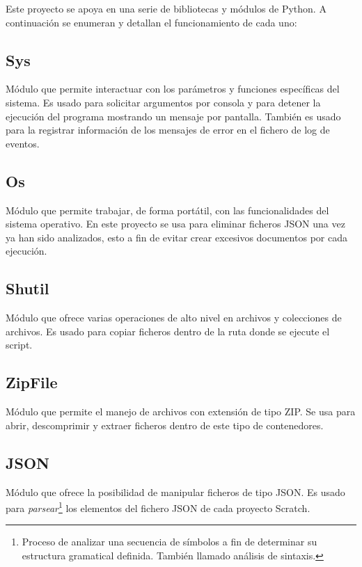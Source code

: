 \documentclass[a4paper, 12pt]{book}
\begin{document}
Este proyecto se apoya en una serie de bibliotecas y módulos de Python. A continuación se enumeran y detallan el funcionamiento de cada uno:

\subsection{Sys}
\label{sec:sys}

Módulo que permite interactuar con los parámetros y funciones específicas del sistema. Es usado para solicitar argumentos por consola y para detener la ejecución del programa mostrando un mensaje por pantalla. También es usado para la registrar información de los mensajes de error en el fichero de log de eventos.

\subsection{Os}
\label{sec:os}

Módulo que permite trabajar, de forma portátil, con las funcionalidades del sistema operativo. En este proyecto se usa para eliminar ficheros JSON una vez ya han sido analizados, esto a fin de evitar crear excesivos documentos por cada ejecución.

\subsection{Shutil}
\label{sec:os}

Módulo que ofrece varias operaciones de alto nivel en archivos y colecciones de archivos. Es usado para copiar ficheros dentro de la ruta donde se ejecute el script.

\subsection{ZipFile}
\label{sec:zipfile}

Módulo que permite el manejo de archivos con extensión de tipo ZIP. Se usa para abrir, descomprimir y extraer ficheros dentro de este tipo de contenedores.

\subsection{JSON}
\label{sec:jsonmodule}

Módulo que ofrece la posibilidad de manipular ficheros de tipo JSON. Es usado para \textit{parsear}\footnote{Proceso de analizar una secuencia de símbolos a fin de determinar su estructura gramatical definida. También llamado análisis de sintaxis.} los elementos del fichero JSON de cada proyecto Scratch.
\end{document}
